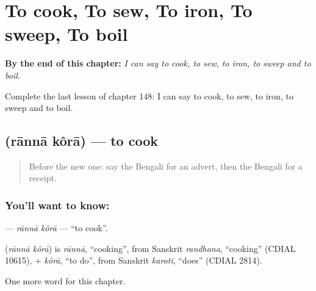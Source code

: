
\chapter{To cook, To sew, To iron, To sweep, To boil}
\label{ch:bn-to-cook-to-sew-to-iron-to-sweep-to-boil}

\begin{chapteropening}
\textbf{By the end of this chapter:} \emph{I can say to cook, to sew, to iron, to sweep and to boil.}

Complete the last lesson of chapter 148: I can say to cook, to sew, to iron, to sweep and to boil.
\end{chapteropening}

\section[\texorpdfstring{\bn{রান্না} \bn{করা} (rānnā kôrā)}{রান্না করা (rānnā kôrā)}]{  (rānnā kôrā) — to cook}

\label{lesson:BN-C148-ranna-kora}



\begin{quote}
Before the new one: say the Bengali for an advert, then the Bengali for a receipt.
\end{quote}

\subsection*{You'll want to know:  }
\textbf{ } — \emph{rānnā kôrā} — \textquotedblleft{}to cook\textquotedblright{}.

\begin{cousinweb}
\textbf{ } (\emph{rānnā kôrā}) is \emph{rānnā}, \textquotedblleft{}cooking\textquotedblright{}, from Sanskrit \emph{randhana}, \textquotedblleft{}cooking\textquotedblright{} (CDIAL 10615), + \emph{kôrā}, \textquotedblleft{}to do\textquotedblright{}, from Sanskrit \emph{karoti}, \textquotedblleft{}does\textquotedblright{} (CDIAL 2814).
\end{cousinweb}

\begin{grammarlens}[title={What you've built}]
One more word for this chapter.
\end{grammarlens}

